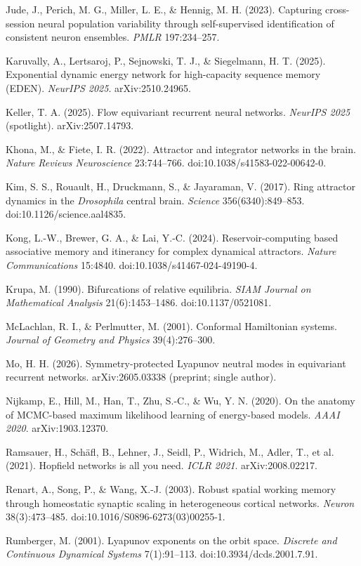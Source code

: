 \documentclass{article}
\begin{document}
{Jude, J., Perich, M. G., Miller, L. E., \& Hennig, M. H. (2023). Capturing cross-session neural population variability through self-supervised identification of consistent neuron ensembles. \emph{PMLR} 197:234--257.\par
Karuvally, A., Lertsaroj, P., Sejnowski, T. J., \& Siegelmann, H. T. (2025). Exponential dynamic energy network for high-capacity sequence memory (EDEN). \emph{NeurIPS 2025}. arXiv:2510.24965.\par
Keller, T. A. (2025). Flow equivariant recurrent neural networks. \emph{NeurIPS 2025} (spotlight). arXiv:2507.14793.\par
Khona, M., \& Fiete, I. R. (2022). Attractor and integrator networks in the brain. \emph{Nature Reviews Neuroscience} 23:744--766. doi:10.1038/s41583-022-00642-0.\par
Kim, S. S., Rouault, H., Druckmann, S., \& Jayaraman, V. (2017). Ring attractor dynamics in the \emph{Drosophila} central brain. \emph{Science} 356(6340):849--853. doi:10.1126/science.aal4835.\par
Kong, L.-W., Brewer, G. A., \& Lai, Y.-C. (2024). Reservoir-computing based associative memory and itinerancy for complex dynamical attractors. \emph{Nature Communications} 15:4840. doi:10.1038/s41467-024-49190-4.\par
Krupa, M. (1990). Bifurcations of relative equilibria. \emph{SIAM Journal on Mathematical Analysis} 21(6):1453--1486. doi:10.1137/0521081.\par
McLachlan, R. I., \& Perlmutter, M. (2001). Conformal Hamiltonian systems. \emph{Journal of Geometry and Physics} 39(4):276--300.\par
Mo, H. H. (2026). Symmetry-protected Lyapunov neutral modes in equivariant recurrent networks. arXiv:2605.03338 (preprint; single author).\par
Nijkamp, E., Hill, M., Han, T., Zhu, S.-C., \& Wu, Y. N. (2020). On the anatomy of MCMC-based maximum likelihood learning of energy-based models. \emph{AAAI 2020}. arXiv:1903.12370.\par
Ramsauer, H., Sch\"afl, B., Lehner, J., Seidl, P., Widrich, M., Adler, T., et al. (2021). Hopfield networks is all you need. \emph{ICLR 2021}. arXiv:2008.02217.\par
Renart, A., Song, P., \& Wang, X.-J. (2003). Robust spatial working memory through homeostatic synaptic scaling in heterogeneous cortical networks. \emph{Neuron} 38(3):473--485. doi:10.1016/S0896-6273(03)00255-1.\par
Rumberger, M. (2001). Lyapunov exponents on the orbit space. \emph{Discrete and Continuous Dynamical Systems} 7(1):91--113. doi:10.3934/dcds.2001.7.91.\par
}
\end{document}
